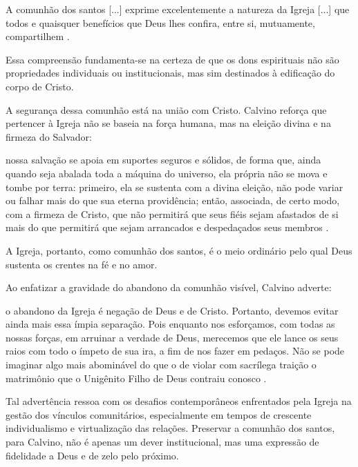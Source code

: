 \begin{citacao}
    A comunhão dos santos [...] exprime excelentemente a natureza da Igreja [...] que todos e quaisquer benefícios que Deus lhes confira, entre si, mutuamente, compartilhem \cite[v.~4, p.~1863]{calvino2022}.
\end{citacao}

Essa compreensão fundamenta-se na certeza de que os dons espirituais não são propriedades individuais ou institucionais, mas sim destinados à edificação do corpo de Cristo.

A segurança dessa comunhão está na união com Cristo. Calvino reforça que pertencer à Igreja não se baseia na força humana, mas na eleição divina e na firmeza do Salvador:

\begin{citacao}
    nossa salvação se apoia em suportes seguros e sólidos, de forma que, ainda quando seja abalada toda a máquina do universo, ela própria não se mova e tombe por terra: primeiro, ela se sustenta com a divina eleição, não pode variar ou falhar mais do que sua eterna providência; então, associada, de certo modo, com a firmeza de Cristo, que não permitirá que seus fiéis sejam afastados de si mais do que permitirá que sejam arrancados e despedaçados seus membros \cite[v.~4, pp.~1863--1864]{calvino2022}.
\end{citacao}

A Igreja, portanto, como comunhão dos santos, é o meio ordinário pelo qual Deus sustenta os crentes na fé e no amor.

Ao enfatizar a gravidade do abandono da comunhão visível, Calvino adverte:

\begin{citacao}
    o abandono da Igreja é negação de Deus e de Cristo. Portanto, devemos evitar ainda mais essa ímpia separação. Pois enquanto nos esforçamos, com todas as nossas forças, em arruinar a verdade de Deus, merecemos que ele lance os seus raios com todo o ímpeto de sua ira, a fim de nos fazer em pedaços. Não se pode imaginar algo mais abominável do que o de violar com sacrílega traição o matrimônio que o Unigênito Filho de Deus contraiu conosco \cite[v.~4, pp.~1877--1878]{calvino2022}.
\end{citacao}

Tal advertência ressoa com os desafios contemporâneos enfrentados pela Igreja na gestão dos vínculos comunitários, especialmente em tempos de crescente individualismo e virtualização das relações. Preservar a comunhão dos santos, para Calvino, não é apenas um dever institucional, mas uma expressão de fidelidade a Deus e de zelo pelo próximo.

